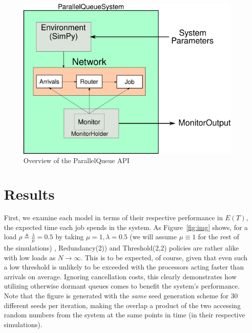 \begin{figure}
    \centering
    \includegraphics[scale=0.7]{pq}
    \caption{Overview of the ParallelQueue API}
    \label{fig:API}
\end{figure}


\section{Results}\label{sec:results}
First, we examine each model in terms of their respective performance in $E(T)$, the expected time each job spends in the system.
As Figure~\ref{fig:img} shows, for a load $\rho \triangleq \frac{\lambda}{\mu} = 0.5$ by taking $\mu=1, \lambda = 0.5$ (we will assume $\mu \equiv 1$ for the
rest of the simulations) , Redundancy(2)) and Threshold(2,2) policies are rather alike with low loads as $N \rightarrow \infty$. This is to be expected, of course, given that even such a low threshold is unlikely to be exceeded with the processors acting faster than arrivals on average. Ignoring cancellation costs, this clearly demonstrates how utilizing otherwise dormant queues comes to benefit the system's performance. Note that the figure is generated with the \textit{same} seed generation scheme for 30 different seeds per iteration, making the overlap a product of the two accessing random numbers from the system at the same points in time (in their respective simulations).


